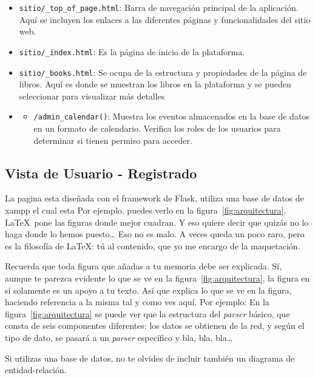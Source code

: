 \documentclass[a4paper, 12pt]{book}
\begin{document}
\begin{itemize}
  \item \texttt{sitio/\_top\_of\_page.html}: Barra de navegación principal de la aplicación. Aquí se incluyen los enlaces a las diferentes páginas y funcionalidades del sitio web.
  \item \texttt{sitio/\_index.html}: Es la página de inicio de la plataforma.
  \item \texttt{sitio/\_books.html}: Se ocupa de la estructura y propiedades de la página de libros. Aquí es donde se muestran los libros en la plataforma y se pueden seleccionar para visualizar más detalles
  \item \textbf{}
    \begin{itemize}
        \item \texttt{/admin\_calendar()}: Muestra los eventos almacenados en la base de datos en un formato de calendario. Verifica los roles de los 
        usuarios para determinar si tienen permiso para acceder.
    \end{itemize}
\end{itemize}

\subsection{Vista de Usuario - Registrado}
\label{sec:vista_usuarios_registrado}

La pagina esta diseñada con el framework de Flask, utiliza una base de datos de xampp el cual esta
Por ejemplo, puedes verlo en la figura~\ref{fig:arquitectura}.
\LaTeX \ pone las figuras donde mejor cuadran. 
Y eso quiere decir que quizás no lo haga donde lo hemos puesto\ldots 
Eso no es malo.
A veces queda un poco raro, pero es la filosofía de \LaTeX: tú al contenido, que yo me encargo de la maquetación.


 
Recuerda que toda figura que añadas a tu memoria debe ser explicada.
Sí, aunque te parezca evidente lo que se ve en la figura~\ref{fig:arquitectura}, la figura en sí solamente es un apoyo a tu texto.
Así que explica lo que se ve en la figura, haciendo referencia a la misma tal y como ves aquí.
Por ejemplo: En la figura~\ref{fig:arquitectura} se puede ver que la estructura del \emph{parser} básico, que consta de seis componentes diferentes: los datos se obtienen de la red, y según el tipo de dato, se pasará a un \emph{parser} específico y bla, bla, bla\ldots

Si utilizas una base de datos, no te olvides de incluir también un diagrama de entidad-relación.
\end{document}
